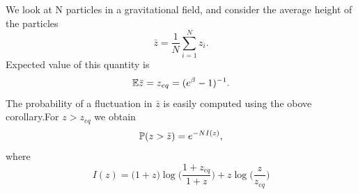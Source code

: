 \documentclass[letterpaper,english,10pt]{article}
\begin{document}
 \begin{exmp}
   We look at N particles in a gravitational field, and consider the average height of the particles 
   \begin{equation}
       \bar{z}= \dfrac{1}{N}\sum_{i=1}^{N}z_i.
    \end{equation}
     Expected value of this quantity  is 
       \begin{equation}
           \E{\bar{z}}= z_{eq}= (e^\beta -1)^{-1}.
           \end{equation}
           The probability of a fluctuation in $\bar{z}$ is easily computed using the obove corollary.For $z>z_{eq}$ we obtain 
           \begin{equation}
               \P(z>\bar{z}) = e^{-NI(z)},
           \end{equation}
           where 
           \begin{equation}
               I(z) = \big(1+z\big)\log \big( \dfrac{1+z_{eq}}{1+z}\big) + z\log{\big(\dfrac{z}{z_{eq}}\big)}
           \end{equation}
           
       
   
 \end{exmp}
\end{document}

